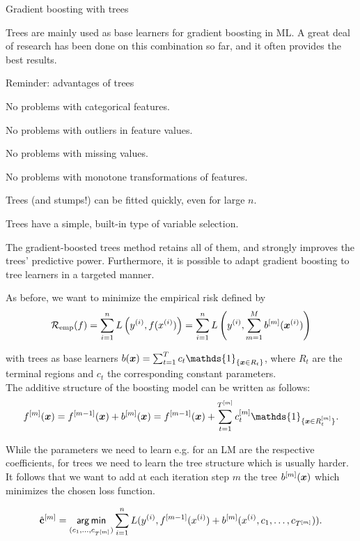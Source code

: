 \begin{vbframe}{Gradient boosting with trees}

Trees are mainly used as base learners for gradient boosting in ML.
A great deal of research has been done on this combination so far, and it often provides the best results.

\begin{blocki}{Reminder: advantages of trees}
\item No problems with categorical features.
\item No problems with outliers in feature values.
\item No problems with missing values.
\item No problems with monotone transformations of features.
\item Trees (and stumps!) can be fitted quickly, even for large $n$.
\item Trees have a simple, built-in type of variable selection.
\end{blocki}
The gradient-boosted trees method retains all of them, and strongly improves the trees' predictive power.
Furthermore, it is possible to adapt gradient boosting to tree learners in a targeted manner.

\framebreak

As before, we want to minimize the empirical risk defined by
$$
\mathcal{R}_{\text{emp}}(f) = \sum_{i=1}^n L\left(y^{(i)},f(x^{(i)}) \right) =
\sum_{i=1}^n L\left(y^{(i)}, \sum_{m=1}^M b^{[m]}(\bm{x}^{(i)})\right)
$$

with trees as base learners $ b(\xv) = \sum_{t=1}^{T} c_t \mathds{1}_{\{\xv \in R_t\}} $,
where $R_t$ are the terminal regions and $c_t$ the corresponding constant parameters.\\
\lz
The additive structure of the boosting model can be written as follows:
$$
\fm(\xv) = \fmd(\xv) +  \bmm(\xv) = \fmd(\xv) +  \sum_{t=1}^{\Tm} \ctm \mathds{1}_{\{\xv \in \Rtm\}}. 
$$

\framebreak

While the parameters we need to learn e.g. for an LM are the respective coefficients, for trees we need to learn the tree structure which is usually harder. It follows that we want to add at each iteration step $m$ the tree $b^{[m]}(\bm{x})$ which minimizes the chosen loss function.

$$
\hat{\mathbf{c}}^{[m]} = \mathop{\sf arg\,min}_{(c_1,\dots,c_{T^{[m]}})}\sum_{i = 1}^n L(y^{(i)}, f^{[m-1]}(x^{(i)}) + b^{[m]}(x^{(i)}, c_1,\dots,c_{T^{[m]}})).
$$


\end{vbframe}

